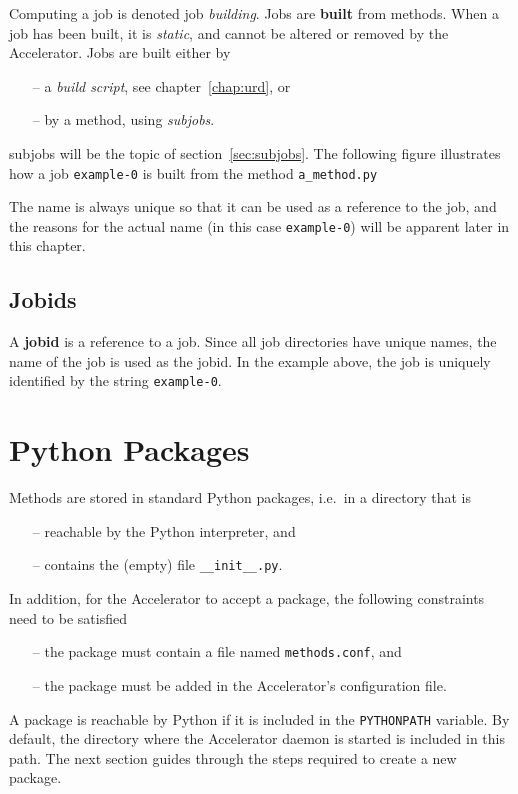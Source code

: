 Computing a job is denoted job \textsl{building}.
Jobs are \textbf{built} from methods.  When a job has been built, it
is \textsl{static}, and cannot be altered or removed by the
Accelerator.  Jobs are built either by
\begin{itemize}
\item[--] a \textsl{build script}, see chapter~\ref{chap:urd}, or
\item[--] by a method, using \textsl{subjobs}.
\end{itemize}
subjobs will be the topic of section~\ref{sec:subjobs}.  The following figure
illustrates how a job \texttt{example-0} is built from the
method \texttt{a\_method.py}
\begin{figure}[h!]
  \begin{center}
    
    \label{fig:method}
  \end{center}
\end{figure}

\noindent The name is always unique so that it
can be used as a reference to the job, and the reasons for the actual
name (in this case \texttt{example-0}) will be apparent later in this
chapter.



\subsection{Jobids}
A \textbf{jobid} is a reference to a job.  Since all job directories
have unique names, the name of the job is used as the jobid.  In the
example above, the job is uniquely identified by the
string \texttt{example-0}.



\section{Python Packages}
Methods are stored in standard Python packages, i.e.\ in a directory that is
\begin{itemize}
\item[--] reachable by the Python interpreter, and
\item[--] contains the (empty) file \texttt{\_\_init\_\_.py}.
\end{itemize}
In addition, for the Accelerator to accept a package, the following
constraints need to be satisfied
\begin{itemize}
\item[--] the package must contain a file named \texttt{methods.conf}, and
\item[--] the package must be added in the Accelerator's configuration file.
\end{itemize}
A package is reachable by Python if it is included in
the \texttt{PYTHONPATH} variable.  By default, the directory where the
Accelerator daemon is started is included in this path.  The next
section guides through the steps required to create a new package.



